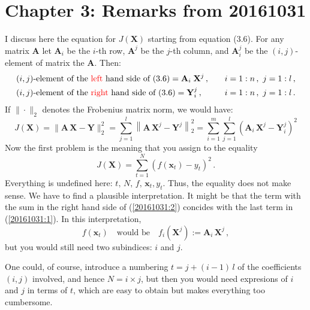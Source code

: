 
\section{Chapter 3: Remarks from 20161031}

\begin{description}[style=unboxed,leftmargin=0cm,itemsep=3ex]

I discuss here the equation for $J(\mathbf{X})$ starting from equation (3.6).
For any matrix $\mathbf{A}$ let 
$\mathbf{A}_i$ be the $i$-th row,
$\mathbf{A}^j$ be the $j$-th column, and
$\mathbf{A}_i^j$ be the $(i,j)$-element of matrix the $\mathbf{A}$.
Then:
\begin{alignat*}{2}
&\text{$(i,j)$-element of the {\color{red} left} hand side of (3.6)}
= \mathbf{A}_i\;\mathbf{X}^j\,, &\quad& i=1:n\,,\ j=1:l\,, \\
&\text{$(i,j)$-element of the {\color{red} right} hand side of (3.6)}
= \mathbf{Y}_i^j\,, &\quad& i=1:n\,,\ j=1:l\,.
\end{alignat*}
If $\|\cdot\|_2$ denotes the Frobenius matrix norm, we would have:
\begin{equation}\label{20161031:1}
J(\mathbf{X})
= \|\mathbf{A}\,\mathbf{X}-\mathbf{Y}\|_2^2
= \sum_{j=1}^l \left\| \mathbf{A}\,\mathbf{X}^j - \mathbf{Y}^j \right\|_2^2
= \sum_{i=1}^m \sum_{j=1}^l 
  \left( \mathbf{A}_i\,\mathbf{X}^j - \mathbf{Y}_i^j \right)^2
\end{equation}
Now the first problem is the meaning that you assign to the equality
\begin{equation}\label{20161031:2}
J(\mathbf{X})=\sum_{t=1}^N \left(f(\mathbf{x}_t)-y_t\right)^2\,.
\end{equation}
Everything is undefined here: $t,\,N,\,f,\,\mathbf{x}_t,y_t$.
Thus, the equality does not make sense.
We have to find a plausible interpretation.
It might be that the term with the sum in the right hand side of
(\ref{20161031:2}) concides with the last term in (\ref{20161031:1}).
In this interpretation, 
\begin{equation}\label{20161031:3}
f(\mathbf{x}_t) \quad\text{would be}\quad 
f_i(\mathbf{X}^j):=\mathbf{A}_i\,\mathbf{X}^j\,,
\end{equation}
but you would still need two subindices: $i$ and $j$.

One could, of course, introduce a numbering $t=j+(i-1)\,l$ of the
coefficients $(i,j)$ involved, and hence $N=i\times j$, but then you
would need expresions of $i$ and $j$ in terms of $t$, which are easy
to obtain but makes everything too cumbersome.


\end{description}
